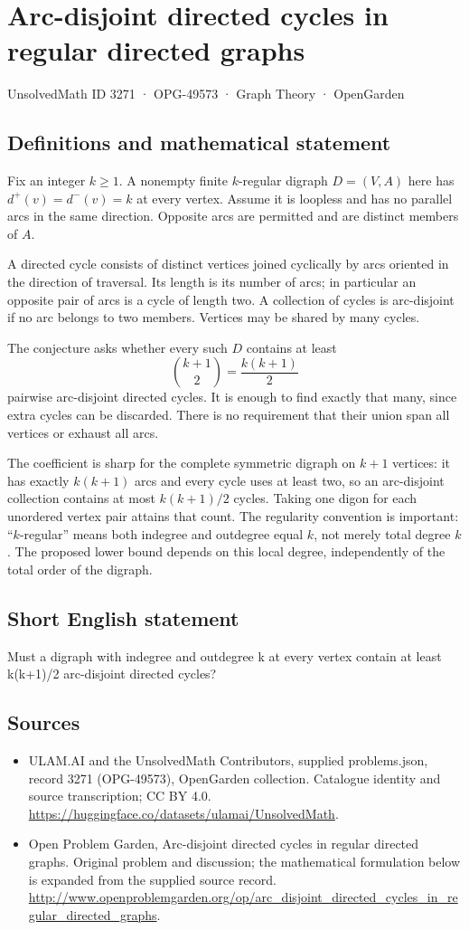 \documentclass[11pt,a4paper]{article}
\begin{document}
\section*{Arc-disjoint directed cycles in regular directed graphs}\label{3271}
{\small UnsolvedMath ID 3271 · OPG-49573 · Graph Theory · OpenGarden}
\subsection{Definitions and mathematical statement}
Fix an integer $k\ge1$. A nonempty finite $k$-regular digraph $D=(V,A)$ here has
$d^+(v)=d^-(v)=k$ at every vertex. Assume it is loopless and has no
parallel arcs in the same direction. Opposite arcs are permitted and
are distinct members of $A$.

A directed cycle consists of distinct vertices joined cyclically by
arcs oriented in the direction of traversal. Its length is its number
of arcs; in particular an opposite pair of arcs is a cycle of length
two. A collection of cycles is arc-disjoint if no arc belongs to two
members. Vertices may be shared by many cycles.

The conjecture asks whether every such $D$ contains at least
\[
                             \binom{k+1}{2}=\frac{k(k+1)}2
\]
pairwise arc-disjoint directed cycles. It is enough to find exactly
that many, since extra cycles can be discarded. There is no requirement
that their union span all vertices or exhaust all arcs.

The coefficient is sharp for the complete symmetric digraph on $k+1$
vertices: it has exactly $k(k+1)$ arcs and every cycle uses at least two,
so an arc-disjoint collection contains at most $k(k+1)/2$ cycles. Taking
one digon for each unordered vertex pair attains that count. The
regularity convention is important: ``$k$-regular'' means both indegree
and outdegree equal $k$, not merely total degree $k$. The proposed lower
bound depends on this local degree, independently of the total order
of the digraph.
\subsection{Short English statement}
Must a digraph with indegree and outdegree k at every vertex contain at least k(k+1)/2 arc-disjoint directed cycles?
\subsection{Sources}
\begin{itemize}
\item[S1] ULAM.AI and the UnsolvedMath Contributors, supplied problems.json, record 3271 (OPG-49573), OpenGarden collection. Catalogue identity and source transcription; CC BY 4.0.
\url{https://huggingface.co/datasets/ulamai/UnsolvedMath}.
\item[S2] Open Problem Garden, Arc-disjoint directed cycles in regular directed graphs. Original problem and discussion; the mathematical formulation below is expanded from the supplied source record.
\url{http://www.openproblemgarden.org/op/arc_disjoint_directed_cycles_in_regular_directed_graphs}.
\end{itemize}
\end{document}
